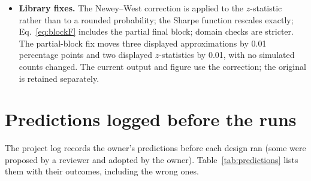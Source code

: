 \documentclass[11pt,a4paper]{article}
\begin{document}
\begin{itemize}
\item \textbf{Library fixes.} The Newey--West correction is applied to the $z$-statistic rather than to a rounded probability; the Sharpe function rescales exactly; Eq.~\eqref{eq:blockF} includes the partial final block; domain checks are stricter. The partial-block fix moves three displayed approximations by 0.01 percentage points and two displayed $z$-statistics by 0.01, with no simulated counts changed. The current output and figure use the correction; the original is retained separately.
\end{itemize}

\section{Predictions logged before the runs}\label{app:predictions}

The project log records the owner's predictions before each design ran (some were proposed by a reviewer and adopted by the owner). Table~\ref{tab:predictions} lists them with their outcomes, including the wrong ones.
\end{document}
